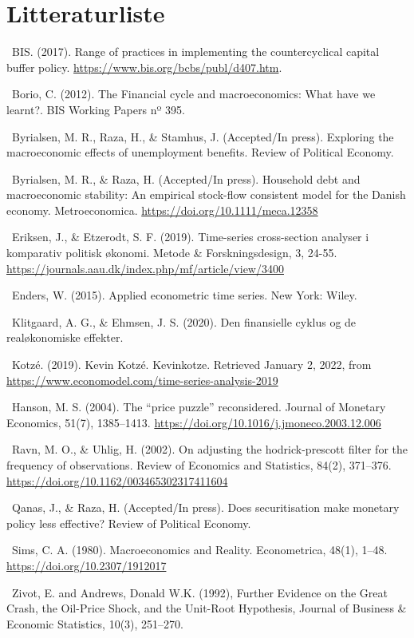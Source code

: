 \documentclass[
  10pt,
]{article}
\begin{document}




\hypertarget{litteraturliste}{%
\section{Litteraturliste}\label{litteraturliste}}

~BIS. (2017). Range of practices in implementing the countercyclical
capital buffer policy. \url{https://www.bis.org/bcbs/publ/d407.htm}.

~Borio, C. (2012). The Financial cycle and macroeconomics: What have we
learnt?. BIS Working Papers nº 395.

~Byrialsen, M. R., Raza, H., \& Stamhus, J. (Accepted/In press).
Exploring the macroeconomic effects of unemployment benefits. Review of
Political Economy.

~Byrialsen, M. R., \& Raza, H. (Accepted/In press). Household debt and
macroeconomic stability: An empirical stock-flow consistent model for
the Danish economy. Metroeconomica.
\url{https://doi.org/10.1111/meca.12358}

~Eriksen, J., \& Etzerodt, S. F. (2019). Time-series cross-section
analyser i komparativ politisk økonomi. Metode \& Forskningsdesign, 3,
24-55. \url{https://journals.aau.dk/index.php/mf/article/view/3400}

~Enders, W. (2015). Applied econometric time series. New York: Wiley.

~Klitgaard, A. G., \& Ehmsen, J. S. (2020). Den finansielle cyklus og de
realøkonomiske effekter.

~Kotzé. (2019). Kevin Kotzé. Kevinkotze. Retrieved January 2, 2022, from
\url{https://www.economodel.com/time-series-analysis-2019}

~Hanson, M. S. (2004). The ``price puzzle'' reconsidered. Journal of
Monetary Economics, 51(7), 1385--1413.
\url{https://doi.org/10.1016/j.jmoneco.2003.12.006}

~Ravn, M. O., \& Uhlig, H. (2002). On adjusting the hodrick-prescott
filter for the frequency of observations. Review of Economics and
Statistics, 84(2), 371--376.
\url{https://doi.org/10.1162/003465302317411604}

~Qanas, J., \& Raza, H. (Accepted/In press). Does securitisation make
monetary policy less effective? Review of Political Economy.

~Sims, C. A. (1980). Macroeconomics and Reality. Econometrica, 48(1),
1--48. \url{https://doi.org/10.2307/1912017}

~Zivot, E. and Andrews, Donald W.K. (1992), Further Evidence on the
Great Crash, the Oil-Price Shock, and the Unit-Root Hypothesis, Journal
of Business \& Economic Statistics, 10(3), 251--270.\\
\end{document}
